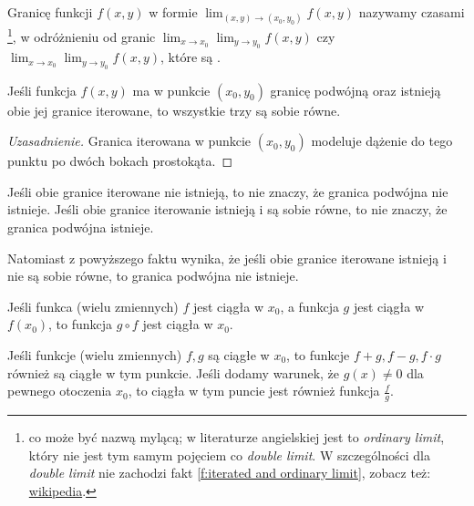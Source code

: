 Granicę funkcji $f(x, y)$ w formie $\lim_{(x, y) \to (x_0, y_0)} f(x, y)$ nazywamy czasami \footnote{co może być nazwą mylącą; w literaturze angielskiej jest to \textit{ordinary limit}, który nie jest tym samym pojęciem co \textit{double limit}. W szczególności dla \textit{double limit} nie zachodzi fakt \ref{f:iterated and ordinary limit}, zobacz też: \href{https://en.wikipedia.org/wiki/Iterated_limit\#Limit_of_function}{wikipedia}.}, w odróżnieniu od granic $\lim_{x\to x_0} \lim_{y\to y_0} f(x, y)$ czy $\lim_{x\to x_0} \lim_{y\to y_0} f(x, y)$, które są .

\begin{fact}
    \label{f:iterated and ordinary limit}
    Jeśli funkcja $f(x, y)$ ma w punkcie $(x_0, y_0)$ granicę podwójną oraz istnieją obie jej granice iterowane, to wszystkie trzy są sobie równe.
\end{fact}
\begin{proof}[Uzasadnienie]
    Granica iterowana w punkcie $(x_0, y_0)$ modeluje dążenie do tego punktu po dwóch bokach prostokąta.
\end{proof}

\begin{remark*}
    Jeśli obie granice iterowane nie istnieją, to nie znaczy, że granica podwójna nie istnieje. Jeśli obie granice iterowanie istnieją i są sobie równe, to nie znaczy, że granica podwójna istnieje.

    Natomiast z powyższego faktu wynika, że jeśli obie granice iterowane istnieją i nie są sobie równe, to granica podwójna nie istnieje.
\end{remark*}

\begin{fact}
    Jeśli funkca (wielu zmiennych) $f$ jest ciągła w $x_0$, a funkcja $g$ jest ciągła w $f(x_0)$, to funkcja $g\circ f$ jest ciągła w $x_0$.
\end{fact}

\begin{fact}
    Jeśli funkcje (wielu zmiennych) $f, g$ są ciągłe w $x_0$, to funkcje $f+g, f-g, f\cdot g$ również są ciągłe w tym punkcie. Jeśli dodamy warunek, że $g(x) \neq 0$ dla pewnego otoczenia $x_0$, to ciągła w tym puncie jest również funkcja $\frac{f}{g}$.
\end{fact}